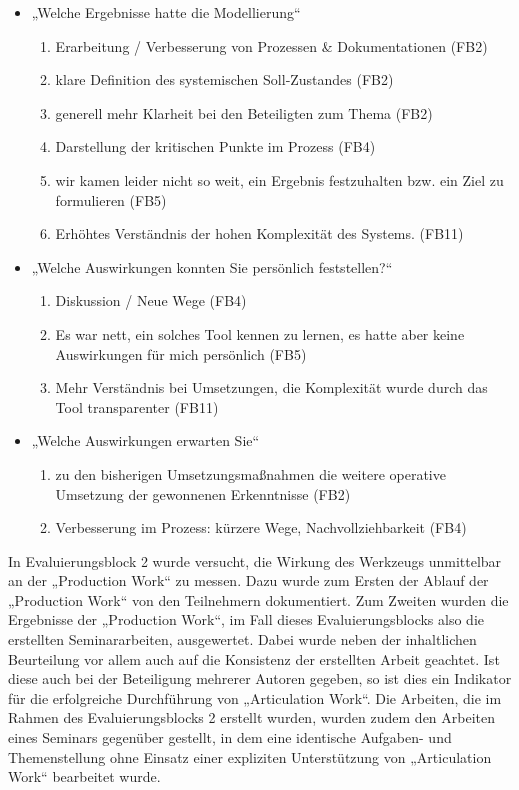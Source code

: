 \begin{itemize}
	\item „Welche Ergebnisse hatte die Modellierung“
		\begin{enumerate}
			\item Erarbeitung / Verbesserung von Prozessen \& Dokumentationen (FB2)
			\item klare Definition des systemischen Soll‐Zustandes (FB2)
			\item generell mehr Klarheit bei den Beteiligten zum Thema (FB2)
			\item Darstellung der kritischen Punkte im Prozess (FB4)
			\item wir kamen leider nicht so weit, ein Ergebnis festzuhalten bzw. ein Ziel zu formulieren (FB5)
			\item Erhöhtes Verständnis der hohen Komplexität des Systems. (FB11) 
		\end{enumerate}
	\item „Welche Auswirkungen konnten Sie persönlich feststellen?“
		\begin{enumerate}
			\item Diskussion / Neue Wege (FB4)
			\item Es war nett, ein solches Tool kennen zu lernen, es hatte aber keine Auswirkungen für mich persönlich (FB5)
			\item Mehr Verständnis bei Umsetzungen, die Komplexität wurde durch das Tool transparenter (FB11) 
		\end{enumerate}
	\item „Welche Auswirkungen erwarten Sie“
		\begin{enumerate}
			\item zu den bisherigen Umsetzungsmaßnahmen die weitere operative Umsetzung der gewonnenen Erkenntnisse (FB2)
			\item Verbesserung im Prozess: kürzere Wege, Nachvollziehbarkeit (FB4)
		\end{enumerate}
\end{itemize}

In Evaluierungsblock 2 wurde versucht, die Wirkung des Werkzeugs unmittelbar an der „Production Work“ zu messen. Dazu wurde zum Ersten der Ablauf der „Production Work“ von den Teilnehmern dokumentiert. Zum Zweiten wurden die Ergebnisse der „Production Work“, im Fall dieses Evaluierungsblocks also die erstellten Seminararbeiten, ausgewertet. Dabei wurde neben der inhaltlichen Beurteilung vor allem auch auf die Konsistenz der erstellten Arbeit geachtet. Ist diese auch bei der Beteiligung mehrerer Autoren gegeben, so ist dies ein Indikator für die erfolgreiche Durchführung von „Articulation Work“. Die Arbeiten, die im Rahmen des Evaluierungsblocks 2 erstellt wurden, wurden zudem den Arbeiten eines Seminars gegenüber gestellt, in dem eine identische Aufgaben- und Themenstellung ohne Einsatz einer expliziten Unterstützung von „Articulation Work“ bearbeitet wurde.


